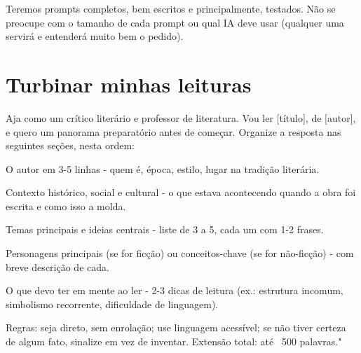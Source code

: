 \documentclass[11pt, a4paper]{article}
\begin{document}
Teremos prompts completos, bem escritos e principalmente, testados. Não se preocupe com o tamanho de cada prompt ou qual IA deve usar (qualquer uma servirá e entenderá muito bem o pedido).

\section*{Turbinar minhas leituras}
\begin{promptbox}
Aja como um crítico literário e professor de literatura. Vou ler [título], de [autor], e quero um panorama preparatório antes de começar. Organize a resposta nas seguintes seções, nesta ordem:

O autor em 3-5 linhas - quem é, época, estilo, lugar na tradição literária.

Contexto histórico, social e cultural - o que estava acontecendo quando a obra foi escrita e como isso a molda.

Temas principais e ideias centrais - liste de 3 a 5, cada um com 1-2 frases.

Personagens principais (se for ficção) ou conceitos-chave (se for não-ficção) - com breve descrição de cada.

O que devo ter em mente ao ler - 2-3 dicas de leitura (ex.: estrutura incomum, simbolismo recorrente, dificuldade de linguagem).

Regras: seja direto, sem enrolação; use linguagem acessível; se não tiver certeza de algum fato, sinalize em vez de inventar. Extensão total: até ~500 palavras."
\end{promptbox}
\end{document}
